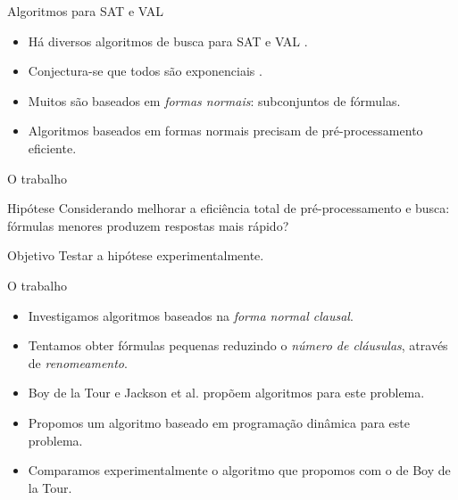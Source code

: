 \begin{frame}{Algoritmos para SAT e VAL}
	\begin{itemize}
		\item Há diversos algoritmos de busca para SAT e VAL \cite{davis1960computing,davis1962machine,biere2009conflict}.
		\pause\item Conjectura-se que todos são exponenciais \cite{cook1971complexity}.
		\pause\item Muitos são baseados em \emph{formas normais}: subconjuntos de fórmulas.
		\pause\item Algoritmos baseados em formas normais precisam de pré-processamento eficiente.
	\end{itemize}
\end{frame}

\begin{frame}{O trabalho}
	\begin{block}{Hipótese}
		Considerando melhorar a eficiência total de pré-processamento e busca: fórmulas menores produzem respostas mais rápido?
	\end{block}
	\pause
	\begin{block}{Objetivo}
		Testar a hipótese experimentalmente.
	\end{block}
\end{frame}

\begin{frame}{O trabalho}
	\begin{itemize}
		\item Investigamos algoritmos baseados na \emph{forma normal clausal}.
		\pause\item Tentamos obter fórmulas pequenas reduzindo o \emph{número de cláusulas}\pause, através de \emph{renomeamento}.
		\pause\item Boy de la Tour \cite{de1992optimality} e Jackson et al. \cite{jackson2004clause} propõem algoritmos para este problema.
		\pause\item Propomos um algoritmo baseado em programação dinâmica para este problema.
		\pause\item Comparamos experimentalmente o algoritmo que propomos com o de Boy de la Tour.
	\end{itemize}
\end{frame}
